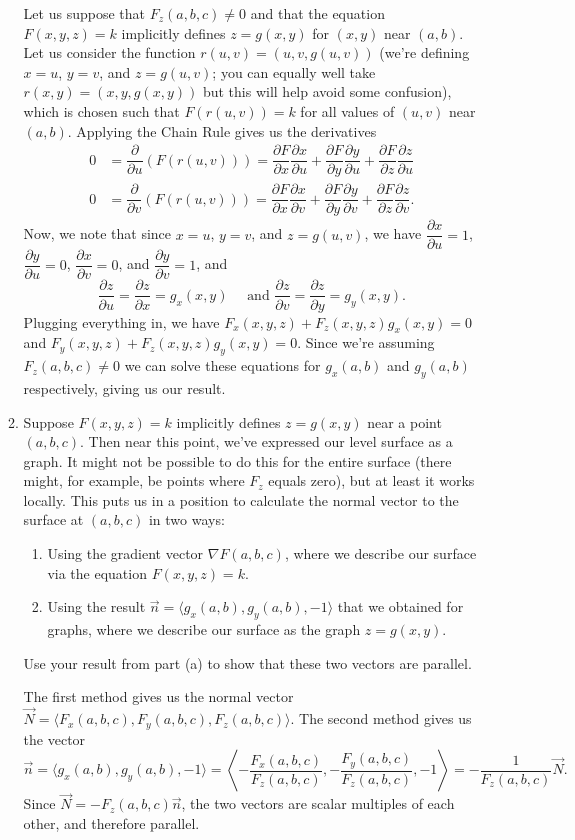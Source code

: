 \documentclass[letterpaper,12pt]{article}
\newcommand{\pd}[2]{\dfrac{\partial #1}{\partial #2}}
\begin{document}
\begin{enumerate}
\begin{enumerate}
\bigskip

Let us suppose that $F_z(a,b,c)\neq 0$ and that the equation $F(x,y,z)=k$ implicitly defines $z=g(x,y)$ for $(x,y)$ near $(a,b)$. Let us consider the function 
$r(u,v) = (u,v,g(u,v))$ (we're defining $x=u$, $y=v$, and $z=g(u,v)$; you can equally well take $r(x,y)=(x,y,g(x,y))$ but this will help avoid some confusion), which is chosen such that $F(r(u,v))=k$ for all values of $(u,v)$ near $(a,b)$.  Applying the Chain Rule gives us the derivatives
\begin{align*}
 0&=\pd{}{u}(F(r(u,v))) = \pd{F}{x}\pd{x}{u}+\pd{F}{y}\pd{y}{u}+\pd{F}{z}\pd{z}{u}\\
 0&=\pd{}{v}(F(r(u,v))) = \pd{F}{x}\pd{x}{v}+\pd{F}{y}\pd{y}{v}+\pd{F}{z}\pd{z}{v}.
\end{align*}
Now, we note that since $x=u$, $y=v$, and $z=g(u,v)$, we have $\pd{x}{u}=1$, $\pd{y}{u}=0$, $\pd{x}{v}=0$, and $\pd{y}{v}=1$, and
\[
 \pd{z}{u}=\pd{z}{x} = g_x(x,y) \quad \text{ and } \pd{z}{v} = \pd{z}{y} = g_y(x,y).
\]
Plugging everything in, we have $F_x(x,y,z)+F_z(x,y,z)g_x(x,y) = 0$ and $F_y(x,y,z)+F_z(x,y,z)g_y(x,y)=0$. Since we're assuming $F_z(a,b,c)\neq 0$ we can solve these equations for $g_x(a,b)$ and $g_y(a,b)$ respectively, giving us our result.



 \item Suppose $F(x,y,z)=k$ implicitly defines $z=g(x,y)$ near a point $(a,b,c)$. Then near this point, we've expressed our level surface as a graph. It might not be possible to do this for the entire surface (there might, for example, be points where $F_z$ equals zero), but at least it works locally. This puts us in a position to calculate the normal vector to the surface at $(a,b,c)$ in two ways:
\begin{enumerate}
 \item Using the gradient vector $\nabla F(a,b,c)$, where we describe our surface via the equation $F(x,y,z)=k$.
 \item Using the result $\vec{n} = \langle g_x(a,b), g_y(a,b), -1\rangle$ that we obtained for graphs, where we describe our surface as the graph $z=g(x,y)$.
\end{enumerate}
Use your result from part (a) to show that these two vectors are parallel.

The first method gives us the normal vector $\vec{N} = \langle F_x(a,b,c), F_y(a,b,c), F_z(a,b,c)\rangle$. The second method gives us the vector
\[
 \vec{n} = \langle g_x(a,b),g_y(a,b),-1\rangle = \left\langle -\frac{F_x(a,b,c)}{F_z(a,b,c)}, -\frac{F_y(a,b,c)}{F_z(a,b,c)},-1\right\rangle = -\frac{1}{F_z(a,b,c)}\vec{N}.
\]
Since $\vec{N} = -F_z(a,b,c)\vec{n}$, the two vectors are scalar multiples of each other, and therefore parallel.
\end{enumerate}

\end{enumerate}
\end{document}
